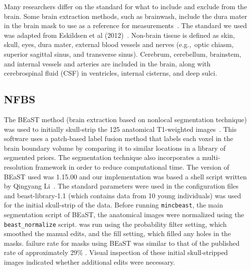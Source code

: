 \par Many researchers differ on the standard for what to include and exclude from the brain. Some brain extraction methods, such as brainwash, include the dura mater in the brain mask to use as a reference for measurements~\cite{Brainwash}. The standard we used was adapted from Eskildsen et al (2012)~\cite{Eskildsen2012}. Non-brain tissue is defined as skin, skull, eyes, dura mater, external blood vessels and nerves (e.g.,~optic chiasm, superior sagittal sinus, and transverse sinus). Cerebrum, cerebellum, brainstem, and internal vessels and arteries are included in the brain, along with cerebrospinal fluid (CSF) in ventricles, internal cisterns, and deep sulci.

\subsection*{NFBS \DIFdelbegin {}\DIFdelend \DIFaddbegin {}\DIFaddend }

\par The BEaST method (brain extraction based on nonlocal segmentation technique) was used to initially skull-strip the 125 anatomical T1-weighted images~\cite{Eskildsen2012}. This software uses a patch-based label fusion method that labels each voxel in the brain boundary volume by comparing it to similar locations in a library of segmented priors. The segmentation technique also incorporates a multi-resolution framework in order to reduce computational time. The version of BEaST used was 1.15.00 and our implementation was based \DIFdelbegin {}\DIFdelend \DIFaddbegin {}\DIFaddend a shell script written by Qingyang Li~\cite{rpubs}. The standard parameters were used in the configuration files and beast-library-1.1 (which contains data from 10 young individuals) was used for the initial skull-strip of the data. Before running {\tt mincbeast}, the main segmentation script of BEaST, the anatomical images were normalized using the {\tt beast\_normalize} script. {\tt \DIFdelbegin {}\DIFdelend \DIFaddbegin {}\DIFaddend } was run using the probability filter setting, which smoothed the manual edits, and the fill setting, which filled any holes in the masks. \DIFdelbegin {}\DIFdelend \DIFaddbegin {}\DIFaddend failure rate for masks using BEaST was similar to that of the published rate of approximately 29\% \cite{Eskildsen2012}. Visual inspection of these initial skull-stripped images indicated whether additional edits were necessary.

